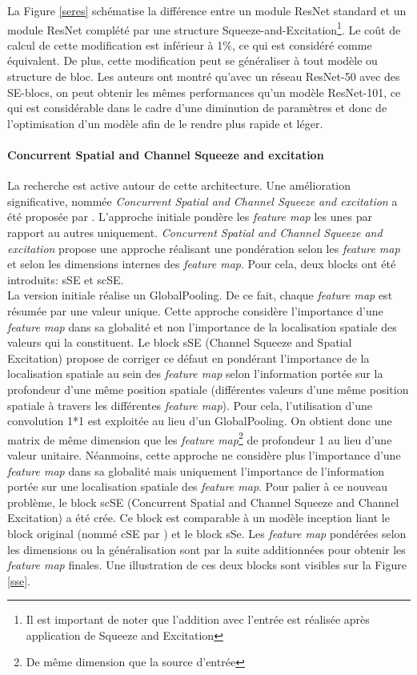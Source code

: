\noindent La Figure \ref{seres} schématise la différence entre un module ResNet standard et un module ResNet complété par une structure Squeeze-and-Excitation\footnote{Il est important de noter que l'addition avec l'entrée est réalisée après application de Squeeze and Excitation}. Le coût de calcul de cette modification est inférieur à 1\%, ce qui est considéré comme équivalent. De plus, cette modification peut se généraliser à tout modèle ou structure de bloc. Les auteurs ont montré qu'avec un réseau ResNet-50 avec des SE-blocs, on peut obtenir les mêmes performances qu'un modèle ResNet-101, ce qui est considérable dans le cadre d'une diminution de paramètres et donc de l'optimisation d'un modèle afin de le rendre plus rapide et léger.\\

\paragraph{Concurrent Spatial and Channel Squeeze and excitation}
La recherche est active autour de cette architecture. Une amélioration significative, nommée \textit{Concurrent Spatial and Channel Squeeze and excitation} a été proposée par \cite{cse}. L'approche initiale pondère les \textit{feature map} les unes par rapport au autres uniquement. \textit{Concurrent Spatial and Channel Squeeze and excitation} propose une approche réalisant une pondération selon les \textit{feature map} et selon les dimensions internes des \textit{feature map}. Pour cela, deux blocks ont été introduits: sSE et scSE. \\

\noindent La version initiale réalise un GlobalPooling. De ce fait, chaque \textit{feature map} est résumée par une valeur unique. Cette approche considère l'importance d'une \textit{feature map} dans sa globalité et non l'importance de la localisation spatiale des valeurs qui la constituent. Le block sSE (Channel Squeeze and Spatial Excitation) propose de corriger ce défaut en pondérant l'importance de la localisation spatiale au sein des \textit{feature map} selon l'information portée sur la profondeur d'une même position spatiale (différentes valeurs d'une même position spatiale à travers les différentes \textit{feature map}). Pour cela, l'utilisation d'une convolution 1*1 est exploitée au lieu d'un GlobalPooling. On obtient donc une matrix de même dimension que les \textit{feature map}\footnote{De même dimension que la source d'entrée} de profondeur 1 au lieu d'une valeur unitaire. Néanmoins, cette approche ne considère plus l'importance d'une \textit{feature map} dans sa globalité mais uniquement l'importance de l'information portée sur une localisation spatiale des \textit{feature map}. Pour palier à ce nouveau problème, le block scSE (Concurrent Spatial and Channel Squeeze and Channel Excitation) a été crée. Ce block est comparable à un modèle inception liant le block original (nommé cSE par \cite{cse}) et le block sSe. Les \textit{feature map} pondérées selon les dimensions ou la généralisation sont par la suite additionnées pour obtenir les \textit{feature map} finales. Une illustration de ces deux blocks sont visibles sur la Figure \ref{sse}.\\

